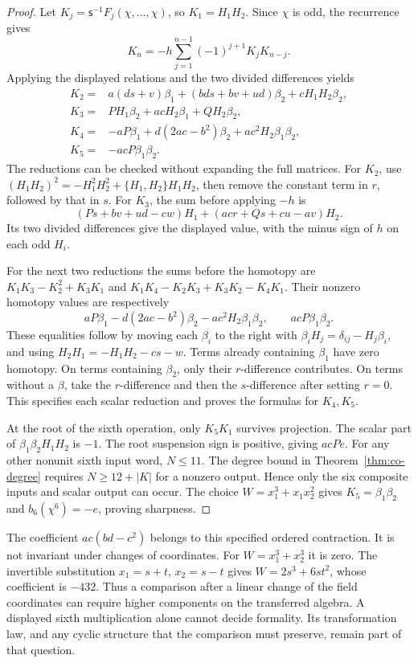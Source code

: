 \begin{proof}
Let \(K_j=\mathsf{s}^{-1}F_j(\chi,\ldots,\chi)\), so
\(K_1=H_1H_2\). Since \(\chi\) is odd, the recurrence gives
\[
 K_n=-h\sum_{j=1}^{n-1}(-1)^{j+1}K_jK_{n-j}.
\]
Applying the displayed relations and the two divided differences yields
\begin{align*}
 K_2={}&a(ds+v)\beta_1+(bd s+bv+ud)\beta_2
                         +cH_1H_2\beta_2,\\
 K_3={}&P H_1\beta_2+acH_2\beta_1+QH_2\beta_2,\\
 K_4={}&-aP\beta_1+d(2ac-b^2)\beta_2
                         +ac^2H_2\beta_1\beta_2,\\
 K_5={}&-acP\beta_1\beta_2.
\end{align*}
The reductions can be checked without expanding the full matrices.
For \(K_2\), use
\((H_1H_2)^2=-H_1^2H_2^2+\{H_1,H_2\}H_1H_2\),
then remove the constant term in \(r\), followed by that in \(s\).
For \(K_3\), the sum before applying \(-h\) is
\[
 (Ps+bv+ud-cw)H_1+(ac r+Qs+cu-av)H_2.
\]
Its two divided differences give the displayed value, with the
minus sign of \(h\) on each odd \(H_i\).

For the next two reductions the sums before the homotopy are
\(K_1K_3-K_2^2+K_3K_1\) and
\(K_1K_4-K_2K_3+K_3K_2-K_4K_1\).
Their nonzero homotopy values are respectively
\[
 aP\beta_1-d(2ac-b^2)\beta_2-ac^2H_2\beta_1\beta_2,
 \qquad acP\beta_1\beta_2.
\]
These equalities follow by moving each \(\beta_i\) to the right
with \(\beta_iH_j=\delta_{ij}-H_j\beta_i\), and using
\(H_2H_1=-H_1H_2-cs-w\).
Terms already containing \(\beta_1\) have zero homotopy.
On terms containing \(\beta_2\), only their \(r\)-difference
contributes. On terms without a \(\beta\), take the \(r\)-difference
and then the \(s\)-difference after setting \(r=0\).
This specifies each scalar reduction and proves the formulas for
\(K_4,K_5\).

At the root of the sixth operation, only \(K_5K_1\) survives
projection. The scalar part of
\(\beta_1\beta_2H_1H_2\) is \(-1\).
The root suspension sign is positive, giving \(acP e\).
For any other nonunit sixth input word, \(N\le11\).
The degree bound in Theorem~\ref{thm:co-degree} requires
\(N\ge12+|K|\) for a nonzero output. Hence only the six
composite inputs and scalar output can occur.
The choice \(W=x_1^3+x_1x_2^2\) gives \(K_5=\beta_1\beta_2\)
and \(b_6(\chi^6)=-e\), proving sharpness.
\end{proof}

The coefficient \(ac(bd-c^2)\) belongs to this specified ordered
contraction. It is not invariant under changes of coordinates.
For \(W=x_1^3+x_2^3\) it is zero. The invertible substitution
\(x_1=s+t\), \(x_2=s-t\) gives \(W=2s^3+6st^2\),
whose coefficient is \(-432\).
Thus a comparison after a linear change of the field coordinates
can require higher components on the transferred algebra.
A displayed sixth multiplication alone cannot decide formality.
Its transformation law, and any cyclic structure that the comparison
must preserve, remain part of that question.
